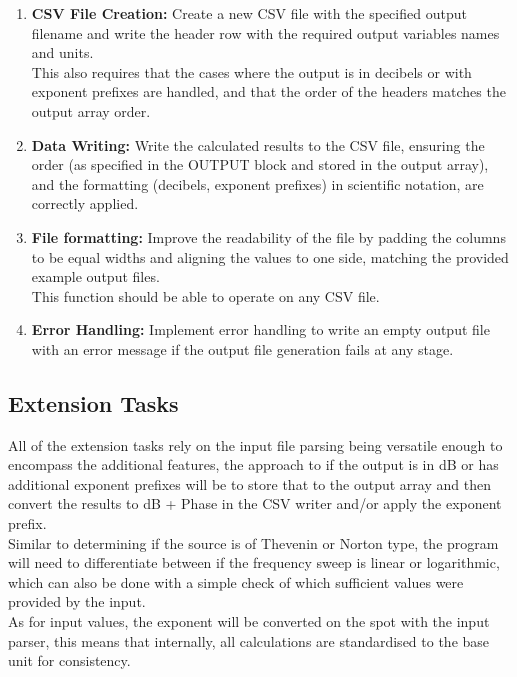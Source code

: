 \documentclass[conference]{IEEEtran}
\begin{document}
\begin{enumerate}
    \item \textbf{CSV File Creation:} Create a new CSV file with the specified output filename and write the header row with the required output variables names and units.\\
    This also requires that the cases where the output is in decibels or with exponent prefixes are handled, and that the order of the headers matches the output array order.
    \item \textbf{Data Writing:} Write the calculated results to the CSV file, ensuring the order (as specified in the OUTPUT block and stored in the output array), 
    and the formatting (decibels, exponent prefixes) in scientific notation, are correctly applied.
    \item \textbf{File formatting:} Improve the readability of the file by padding the columns to be equal widths and aligning the values to one side, matching the provided example output files.\\
    This function should be able to operate on any CSV file.
    \item \textbf{Error Handling:} Implement error handling to write an empty output file with an error message if the output file generation fails at any stage.
\end{enumerate}

\subsection*{\textbf{Extension Tasks}}
All of the extension tasks rely on the input file parsing being versatile enough to encompass the 
additional features, the approach to if the output is in dB or has additional exponent prefixes will be to store that to the output 
array and then convert the results to dB + Phase in the CSV writer and/or apply the exponent prefix.\\

 Similar to determining if the source is of Thevenin or Norton type, the program will need to differentiate between if the frequency sweep is linear or logarithmic,
 which can also be done with a simple check of which sufficient values were provided by the input.\\

As for input values, the exponent will be converted on the spot with the input parser, this means that internally, all calculations are standardised to the base unit for consistency.
\end{document}
